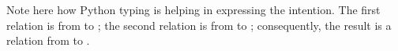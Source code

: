 


Note here how Python typing is helping in expressing the intention.
The first relation is from  to ; the second relation is from  to ; consequently, the result is a relation from  to .
